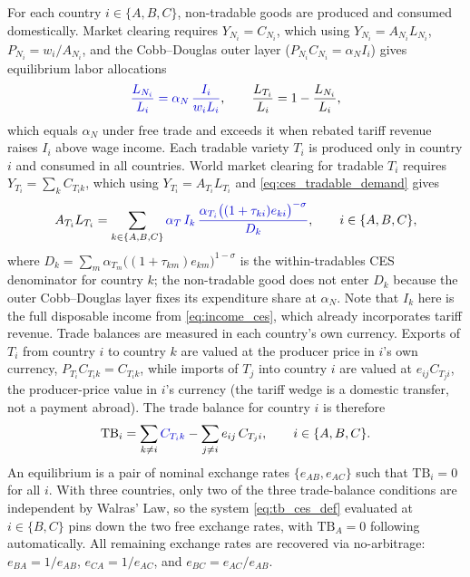 \documentclass[11pt]{article}
\theoremstyle{plain}
\theoremstyle{remark}
\numberwithin{lemma}{section}
\numberwithin{proposition}{section}
\numberwithin{corollary}{section}
\newcommand{\rev}[1]{{\color{RevBlue}#1}}
\begin{document}
For each country $i \in \{A,B,C\}$, non-tradable goods are produced and consumed domestically. Market clearing requires $Y_{N_i} = C_{N_i}$, which using $Y_{N_i} = A_{N_i} L_{N_i}$, $P_{N_i} = w_i/A_{N_i}$, and \rev{the Cobb--Douglas outer layer ($P_{N_i} C_{N_i} = \alpha_N I_i$)} gives equilibrium labor allocations
\begin{equation}
\rev{\frac{L_{N_i}}{L_i} = \alpha_N\, \frac{I_i}{w_i L_i}}, \qquad \frac{L_{T_i}}{L_i} = 1 - \frac{L_{N_i}}{L_i},
\end{equation}
\rev{which equals $\alpha_N$ under free trade and exceeds it when rebated tariff revenue raises $I_i$ above wage income.} Each tradable variety $T_i$ is produced only in country $i$ and consumed in all countries. World market clearing for tradable $T_i$ requires $Y_{T_i} = \sum_{k} C_{T_i k}$, which using $Y_{T_i} = A_{T_i} L_{T_i}$ and \eqref{eq:ces_tradable_demand} gives
\begin{equation}
A_{T_i} L_{T_i} = \sum_{k \in \{A,B,C\}} \rev{\alpha_T\, I_k\, \frac{\alpha_{T_i} \bigl((1+\tau_{ki})e_{ki}\bigr)^{-\sigma}}{D_k}}, \qquad i \in \{A,B,C\},
\label{eq:tradable_market_clearing_ces}
\end{equation}
where \rev{$D_k = \sum_{m} \alpha_{T_m} \bigl((1+\tau_{km})e_{km}\bigr)^{1-\sigma}$ is the within-tradables CES denominator for country $k$; the non-tradable good does not enter $D_k$ because the outer Cobb--Douglas layer fixes its expenditure share at $\alpha_N$.} Note that $I_k$ here is the full disposable income from \eqref{eq:income_ces}, which already incorporates tariff revenue. Trade balances are measured in each country's own currency. \rev{Exports of $T_i$ from country $i$ to country $k$ are valued at the producer price in $i$'s own currency, $P_{T_i} C_{T_i k} = C_{T_i k}$,} while imports of $T_j$ into country $i$ are valued at $e_{ij} C_{T_j i}$\rev{, the producer-price value in $i$'s currency (the tariff wedge is a domestic transfer, not a payment abroad)}. The trade balance for country $i$ is therefore
\begin{equation}
\mathrm{TB}_i = \sum_{k \neq i} \rev{C_{T_i k}} - \sum_{j \neq i} e_{ij}\, C_{T_j i}, \qquad i \in \{A,B,C\}.
\label{eq:tb_ces_def}
\end{equation}
An equilibrium is a pair of nominal exchange rates $\{e_{AB}, e_{AC}\}$ such that $\mathrm{TB}_i = 0$ for all $i$. With three countries, only two of the three trade-balance conditions are independent by Walras' Law, so the system \eqref{eq:tb_ces_def} evaluated at $i \in \{B, C\}$ pins down the two free exchange rates, with $\mathrm{TB}_A = 0$ following automatically. All remaining exchange rates are recovered via no-arbitrage: $e_{BA} = 1/e_{AB}$, $e_{CA} = 1/e_{AC}$, and $e_{BC} = e_{AC}/e_{AB}$.
\end{document}
